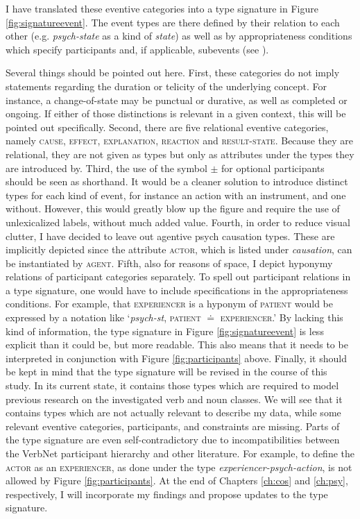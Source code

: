 I have translated these eventive categories into a type signature in Figure \ref{fig:signatureevent}. The event types are there defined by their relation to each other (e.g. \textit{psych-state} as a kind of \textit{state}) as well as by appropriateness conditions which specify participants and, if applicable, subevents (see ). 

Several things should be pointed out here. 
First, these categories do not imply statements regarding the duration or telicity of the underlying concept. For instance, a change-of-state may be punctual or durative, as well as completed or ongoing. If either of those distinctions is relevant in a given context, this will be pointed out specifically.
Second, there are five relational eventive categories, namely \textsc{cause, effect, explanation, reaction} and \textsc{result-state}. Because they are relational, they are not given as types but only as attributes under the types they are introduced by. 
Third, the use of the symbol $\pm$ for optional participants should be seen as shorthand. It would be a cleaner solution to introduce distinct types for each kind of event, for instance an action with an instrument, and one without. However, this would greatly blow up the figure and require the use of unlexicalized labels, without much added value. 
Fourth, in order to reduce visual clutter, I have decided to leave out agentive psych causation types. These are implicitly depicted since the attribute \textsc{actor}, which is listed under \textit{causation}, can be instantiated by \textsc{agent}. 
Fifth, also for reasons of space, I depict hyponymy relations of participant categories separately. To spell out participant relations in a type signature, one would have to include specifications in the appropriateness conditions. For example, that \textsc{experiencer} is a hyponym of \textsc{patient} would be expressed by a notation like `\textit{psych-st}, \textsc{patient} $\doteq$ \textsc{experiencer}.' 
By lacking this kind of information, the type signature in Figure \ref{fig:signatureevent} is less explicit than it could be, but more readable. This also means that it needs to be interpreted in conjunction with Figure \ref{fig:participants} above.
Finally, it should be kept in mind that the type signature will be revised in the course of this study. In its current state, it contains those types which are required to model previous research on the investigated verb and noun classes. We will see that it contains types which are not actually relevant to describe my data, while some relevant eventive categories, participants, and constraints are missing. Parts of the type signature are even self-contradictory due to incompatibilities between the VerbNet participant hierarchy and other literature. For example, to define the \textsc{actor} as an \textsc{experiencer}, as done under the type \textit{experiencer-psych-action}, is not allowed by Figure \ref{fig:participants}. At the end of Chapters \ref{ch:cos} and \ref{ch:psy}, respectively, I will incorporate my findings and propose updates to the type signature.


